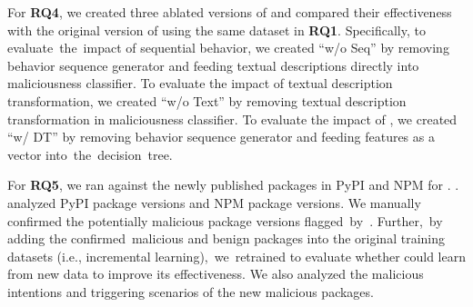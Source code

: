 For \textbf{RQ4}, we created three ablated versions of \tool and compared their effectiveness with the original version of \tool using the same dataset in \textbf{RQ1}. Specifically, to evaluate~the~impact of sequential behavior, we created “\tool w/o Seq” by removing behavior sequence generator and feeding textual descriptions directly into maliciousness classifier. To evaluate the impact of textual description transformation, we created ``\tool w/o Text'' by removing textual description transformation in maliciousness classifier. To evaluate the impact of , we created ``\tool w/ DT'' by removing behavior sequence generator and feeding features as a vector into~the~decision~tree.

For \textbf{RQ5}, we ran  against the newly published packages in PyPI and NPM for .  . \tool analyzed  PyPI package versions and  NPM package versions. We manually confirmed the potentially malicious package versions flagged~by~\tool. Further,~by adding the confirmed~malicious and benign packages into the original training datasets (i.e., incremental learning),~we~retrained  to evaluate whether \tool could learn from new data to improve its effectiveness. We also analyzed the malicious intentions and triggering scenarios of the new malicious packages.

